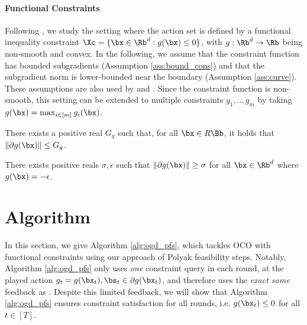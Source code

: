 \paragraph{Functional Constraints}
\label{sec:func}

Following \citet{mahdavi2012trading}, we study the setting where the action set is defined by a functional inequality constraint $\Xc = \{ \bx \in \Rb^d : g(\bx) \leq 0 \}$, with $g : \Rb^d \rightarrow \Rb$ being non-smooth and convex.
In the following, we assume that the constraint function has bounded subgradients (Assumption \ref{ass:bound_cons}) and that the subgradient norm is lower-bounded near the boundary (Assumption \ref{ass:curve}).
These assumptions are also used by \citet{mahdavi2012trading} and \citet{jenatton2016adaptive}.
Since the constraint function is non-smooth, this setting can be extended to multiple constraints $g_1,..,g_m$ by taking $g(\bx) = \max_{i \in [m]} g_i (\bx)$.

\begin{assumption}
    \label{ass:bound_cons}
    There exists a positive real $G_g$ such that, for all $\bx \in R \Bb$, it holds that $\| \partial g(\bx) \| \leq G_g$.
\end{assumption}

\begin{assumption}
    \label{ass:curve}
    There exists positive reals $\sigma, \epsilon$ such that $\| \partial g(\bx) \| \geq \sigma$ for all $\bx \in \Rb^d$ where $g(\bx) = -\epsilon$.
\end{assumption}

\section{Algorithm}

\label{sec:alg}



In this section, we give Algorithm \ref{alg:ogd_pfs}, which tackles OCO with functional constraints using our approach of Polyak feasibility steps.
Notably, Algorithm \ref{alg:ogd_pfs} only uses \emph{one} constraint query in each round, at the played action $g_t = g(\bx_t), \bs_t \in \partial g(\bx_t)$, and therefore uses the \emph{exact same} feedback as \citet{mahdavi2012trading}.
Despite this limited feedback, we will show that Algorithm \ref{alg:ogd_pfs} ensures constraint satisfaction for all rounds, i.e. $g(\bx_t) \leq 0$ for all $t \in [T]$.


